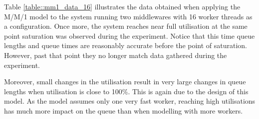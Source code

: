 \documentclass[11pt,a4paper]{article}
\begin{document}
Table \ref{table::mm1_data_16} illustrates the data obtained when applying the M/M/1 model to the system running two middlewares with 16 worker threads as a configuration. Once more, the system reaches near full utilisation at the same point saturation was observed during the experiment. Notice that this time queue lengths and queue times are reasonably accurate before the point of saturation. However, past that point they no longer match data gathered during the experiment.

Moreover, small changes in the utilisation result in very large changes in queue lengths when utilisation is close to 100\%. This is again due to the design of this model. As the model assumes only one very fast worker, reaching high utilisations has much more impact on the queue than when modelling with more workers.

\begin{table}
    \centering
    \caption{Data for M/M/1 queuing model for 32 worker configuration}
    \label{table::mm1_data_32}
\end{table}
\end{document}
